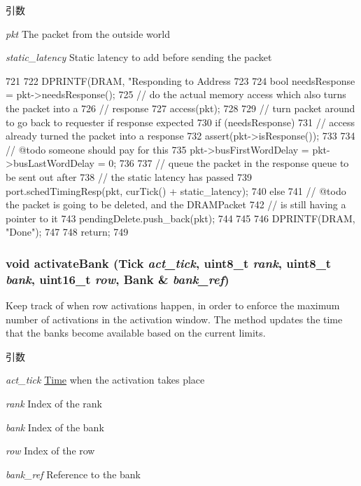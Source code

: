 \begin{DoxyParams}{引数}
\item[{\em pkt}]The packet from the outside world \item[{\em static\_\-latency}]Static latency to add before sending the packet \end{DoxyParams}



\begin{DoxyCode}
721 {
722     DPRINTF(DRAM, "Responding to Address %
723 
724     bool needsResponse = pkt->needsResponse();
725     // do the actual memory access which also turns the packet into a
726     // response
727     access(pkt);
728 
729     // turn packet around to go back to requester if response expected
730     if (needsResponse) {
731         // access already turned the packet into a response
732         assert(pkt->isResponse());
733 
734         // @todo someone should pay for this
735         pkt->busFirstWordDelay = pkt->busLastWordDelay = 0;
736 
737         // queue the packet in the response queue to be sent out after
738         // the static latency has passed
739         port.schedTimingResp(pkt, curTick() + static_latency);
740     } else {
741         // @todo the packet is going to be deleted, and the DRAMPacket
742         // is still having a pointer to it
743         pendingDelete.push_back(pkt);
744     }
745 
746     DPRINTF(DRAM, "Done\n");
747 
748     return;
749 }
\end{DoxyCode}
\hypertarget{classDRAMCtrl_a98181e99df633f767f5116fe80e92042}{
\subsubsection[{activateBank}]{\setlength{\rightskip}{0pt plus 5cm}void activateBank ({\bf Tick} {\em act\_\-tick}, \/  uint8\_\-t {\em rank}, \/  uint8\_\-t {\em bank}, \/  uint16\_\-t {\em row}, \/  {\bf Bank} \& {\em bank\_\-ref})}}
\label{classDRAMCtrl_a98181e99df633f767f5116fe80e92042}
Keep track of when row activations happen, in order to enforce the maximum number of activations in the activation window. The method updates the time that the banks become available based on the current limits.


\begin{DoxyParams}{引数}
\item[{\em act\_\-tick}]\hyperlink{classTime}{Time} when the activation takes place \item[{\em rank}]Index of the rank \item[{\em bank}]Index of the bank \item[{\em row}]Index of the row \item[{\em bank\_\-ref}]Reference to the bank \end{DoxyParams}



